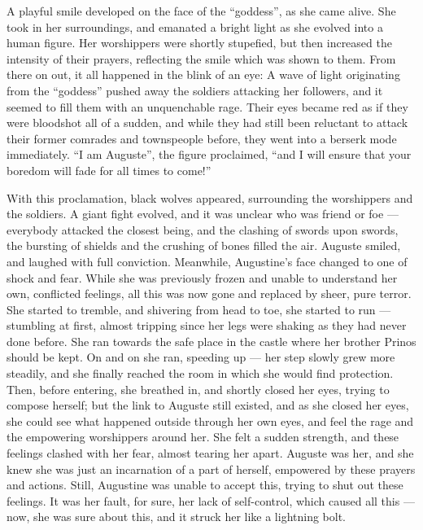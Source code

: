 A playful smile developed on the face of the \enquote{goddess}, as she came alive. She took in her surroundings, and emanated a bright light as she evolved into a human figure. Her worshippers were shortly stupefied, but then increased the intensity of their prayers, reflecting the smile which was shown to them. From there on out, it all happened in the blink of an eye: A wave of light originating from the \enquote{goddess} pushed away the soldiers attacking her followers, and it seemed to fill them with an unquenchable rage. Their eyes became red as if they were bloodshot all of a sudden, and while they had still been reluctant to attack their former comrades and townspeople before, they went into a berserk mode immediately. \enquote{I am Auguste}, the figure proclaimed, \enquote{and I will ensure that your boredom will fade for all times to come!}

With this proclamation, black wolves appeared, surrounding the worshippers and the soldiers. A giant fight evolved, and it was unclear who was friend or foe --- everybody attacked the closest being, and the clashing of swords upon swords, the bursting of shields and the crushing of bones filled the air. Auguste smiled, and laughed with full conviction. Meanwhile, Augustine's face changed to one of shock and fear. While she was previously frozen and unable to understand her own, conflicted feelings, all this was now gone and replaced by sheer, pure terror. She started to tremble, and shivering from head to toe, she started to run --- stumbling at first, almost tripping since her legs were shaking as they had never done before. She ran towards the safe place in the castle where her brother Prinos should be kept. On and on she ran, speeding up --- her step slowly grew more steadily, and she finally reached the room in which she would find protection. Then, before entering, she breathed in, and shortly closed her eyes, trying to compose herself; but the link to Auguste still existed, and as she closed her eyes, she could see what happened outside through her own eyes, and feel the rage and the empowering worshippers around her. She felt a sudden strength, and these feelings clashed with her fear, almost tearing her apart. Auguste was her, and she knew she was just an incarnation of a part of herself, empowered by these prayers and actions. Still, Augustine was unable to accept this, trying to shut out these feelings. It was her fault, for sure, her lack of self-control, which caused all this --- now, she was sure about this, and it struck her like a lightning bolt.

